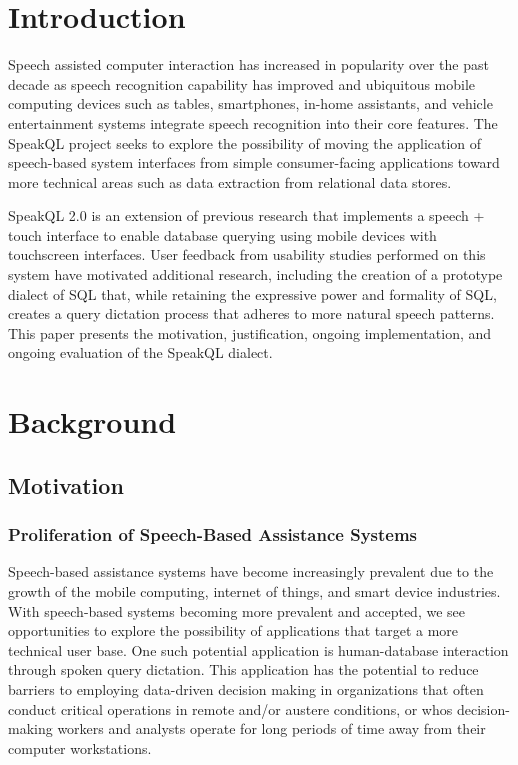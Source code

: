 \section{Introduction}


Speech assisted computer interaction has increased in popularity over the past decade as speech recognition capability has improved and ubiquitous mobile computing devices such as tables, smartphones, in-home assistants, and vehicle entertainment systems integrate speech recognition into their core features. The SpeakQL project seeks to explore the possibility of moving the application of speech-based system interfaces from simple consumer-facing applications toward more technical areas such as data extraction from relational data stores.

SpeakQL 2.0 is an extension of previous research that implements a speech + touch interface to enable database querying using mobile devices with touchscreen interfaces. User feedback from usability studies performed on this system have motivated additional research, including the creation of a prototype dialect of SQL that, while retaining the expressive power and formality of SQL, creates a query dictation process that adheres to more natural speech patterns. This paper presents the motivation, justification, ongoing implementation, and ongoing evaluation of the SpeakQL dialect.


\section{Background}


\subsection{Motivation}

\subsubsection{Proliferation of Speech-Based Assistance Systems}

Speech-based assistance systems have become increasingly prevalent due to the growth of the mobile computing, internet of things, and smart device industries. With speech-based systems becoming more prevalent and accepted, we see opportunities to explore the possibility of applications that target a more technical user base. One such potential application is human-database interaction through spoken query dictation. This application has the potential to reduce barriers to employing data-driven decision making in organizations that often conduct critical operations in remote and/or austere conditions, or whos decision-making workers and analysts operate for long periods of time away from their computer workstations.

